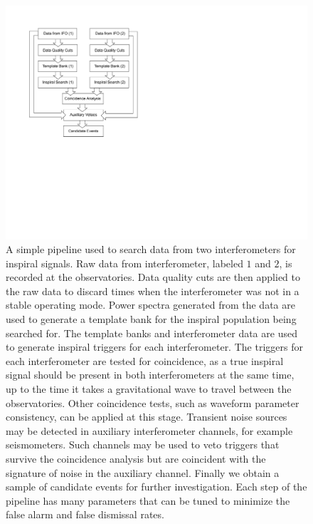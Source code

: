 \begin{figure}[p]
\begin{center}
\includegraphics[height=0.6\textheight]{figures/pipeline/simple_pipe}
\end{center}
\caption[Simple Pipeline to Search Data From Two Interferometers]{
\label{f:simple_pipe}
A simple pipeline used to search data from two interferometers for inspiral
signals. Raw data from interferometer, labeled $1$ and $2$, is recorded at the
observatories. Data quality cuts are then applied to the raw data to discard
times when the interferometer was not in a stable operating mode. Power
spectra generated from the data are used to generate a template bank for the
inspiral population being searched for. The template banks and interferometer
data are used to generate inspiral triggers for each interferometer. The
triggers for each interferometer are tested for coincidence, as a true
inspiral signal should be present in both interferometers at the same time, up
to the time it takes a gravitational wave to travel between the observatories.
Other coincidence tests, such as waveform parameter consistency, can be
applied at this stage. Transient noise sources may be detected in auxiliary
interferometer channels, for example seismometers. Such channels may be used to 
veto triggers that survive the coincidence analysis but are coincident with
the signature of noise in the auxiliary channel. Finally we obtain a sample of
candidate events for further investigation. Each step of the pipeline has many
parameters that can be tuned to minimize the false alarm and false dismissal 
rates.  
}
\end{figure}

